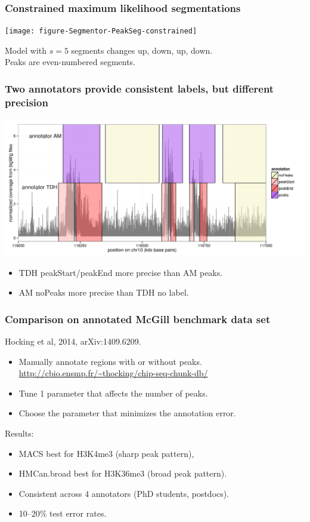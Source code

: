 \documentclass{beamer}
\begin{document}
\begin{frame}
  \frametitle{Constrained maximum likelihood segmentations}
  \texttt{[image: figure-Segmentor-PeakSeg-constrained]}

  Model with $s=5$ segments changes up, down, up, down.\\
  Peaks are even-numbered segments.
\end{frame}

\begin{frame}
  \frametitle{Two annotators provide consistent labels, but different
    precision}
  \includegraphics[width=1.1\textwidth]{figure-several-annotators}

  \begin{itemize}
  \item TDH peakStart/peakEnd more precise than AM peaks.
  \item AM noPeaks more precise than TDH no label.
  \end{itemize}
\end{frame}

\begin{frame}
  \frametitle{Comparison on annotated McGill benchmark data set}
  Hocking et al, 2014, arXiv:1409.6209.\\
  \begin{itemize}
  \item Manually annotate regions with or without peaks.\\
    \url{http://cbio.ensmp.fr/~thocking/chip-seq-chunk-db/}
  \item Tune 1 parameter that affects the number of peaks.
  \item Choose the parameter that minimizes the annotation error.
  \end{itemize}
  Results:
  \begin{itemize}
  \item MACS best for H3K4me3 (sharp peak pattern),
  \item HMCan.broad best for H3K36me3 (broad peak pattern).
  \item Consistent across 4 annotators (PhD students, postdocs).
  \item 10--20\% test error rates.
  \end{itemize}
\end{frame}
\end{document}
